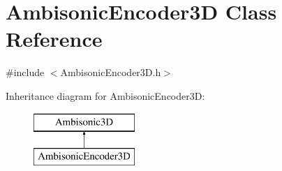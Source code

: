 \hypertarget{class_ambisonic_encoder3_d}{\section{Ambisonic\-Encoder3\-D Class Reference}
\label{class_ambisonic_encoder3_d}
}


{\ttfamily \#include $<$Ambisonic\-Encoder3\-D.\-h$>$}

Inheritance diagram for Ambisonic\-Encoder3\-D\-:\begin{figure}[H]
\begin{center}
\leavevmode
\includegraphics[height=2.000000cm]{class_ambisonic_encoder3_d}
\end{center}
\end{figure}

